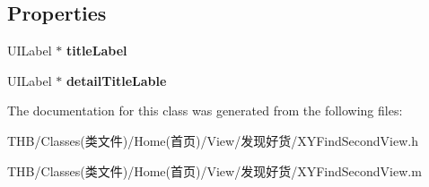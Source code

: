 \subsection*{Properties}
\begin{DoxyCompactItemize}
\item 
\mbox{\label{interface_x_y_find_second_view_a520c01e638146465ed1bda945c29db82}} 
U\+I\+Label $\ast$ {\bfseries title\+Label}
\item 
\mbox{\label{interface_x_y_find_second_view_a41cd35793899438ab1a3fa290f26df24}} 
U\+I\+Label $\ast$ {\bfseries detail\+Title\+Lable}
\end{DoxyCompactItemize}


The documentation for this class was generated from the following files\+:\begin{DoxyCompactItemize}
\item 
T\+H\+B/\+Classes(类文件)/\+Home(首页)/\+View/发现好货/X\+Y\+Find\+Second\+View.\+h\item 
T\+H\+B/\+Classes(类文件)/\+Home(首页)/\+View/发现好货/X\+Y\+Find\+Second\+View.\+m\end{DoxyCompactItemize}
